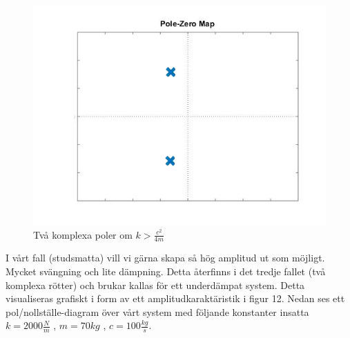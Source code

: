 \documentclass[10pt,a4paper]{article}
\begin{document}
\begin{figure}
\begin{center}
\includegraphics[scale=0.3]{2komplexa}
\caption{Två komplexa poler om $k>\frac{c^2}{4m}$}
\end{center}
\end{figure}
\newpage


I vårt fall (studsmatta) vill vi gärna skapa så hög amplitud ut som möjligt. Mycket svängning och lite dämpning. Detta återfinns i det tredje fallet (två komplexa rötter) och brukar kallas för ett underdämpat system. Detta visualiseras grafiskt i form av ett amplitudkaraktäristik i figur 12. Nedan ses ett pol/nollställe-diagram över vårt system med följande konstanter insatta $k=2000\frac{N}{m}$ , $m=70kg$ , $c=100\frac{kg}{s}$.
\end{document}
